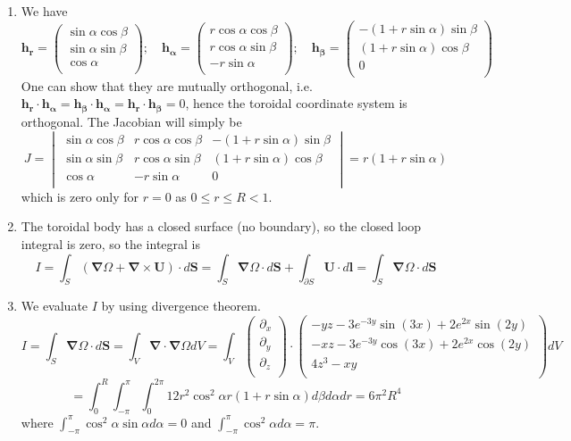 \documentclass[a4paper]{article}
\begin{document}
\begin{ans}\leavevmode
\begin{enumerate}[label=(\alph*)]
    \item We have
$$\mathbf{h_r}=\begin{pmatrix}\sin\alpha\cos\beta\\\sin\alpha\sin\beta\\\cos\alpha\\\end{pmatrix};\quad\boldsymbol{h_\alpha}=\begin{pmatrix}r\cos\alpha\cos\beta\\r\cos\alpha\sin\beta\\-r\sin\alpha\\\end{pmatrix};\quad\boldsymbol{h_\beta}=\begin{pmatrix}-(1+r\sin\alpha)\sin\beta\\(1+r\sin\alpha)\cos\beta\\0\\\end{pmatrix}$$
One can show that they are mutually orthogonal, i.e. $\boldsymbol{h_r}\cdot\boldsymbol{h_\alpha}=\boldsymbol{h_\beta}\cdot\boldsymbol{h_\alpha}=\boldsymbol{h_r}\cdot\boldsymbol{h_\beta}=0$, hence the toroidal coordinate system is orthogonal. The Jacobian will simply be
$$J=\begin{vmatrix}\sin\alpha\cos\beta&r\cos\alpha\cos\beta&-(1+r\sin\alpha)\sin\beta\\\sin\alpha\sin\beta&r\cos\alpha\sin\beta&(1+r\sin\alpha)\cos\beta\\\cos\alpha&-r\sin\alpha&0\\\end{vmatrix}=r(1+r\sin\alpha)$$
which is zero only for $r=0$ as $0\leq r\leq R<1$.
\item The toroidal body has a closed surface (no boundary), so the closed loop integral is zero, so the integral is 
$$I=\int_S(\boldsymbol{\nabla}\Omega+\boldsymbol{\nabla}\times\mathbf{U})\cdot d\mathbf{S}=\int_S\boldsymbol{\nabla}\Omega\cdot d\mathbf{S}+\int_{\partial S}\mathbf{U}\cdot d\mathbf{l}=\int_S\boldsymbol{\nabla}\Omega\cdot d\mathbf{S}$$
\item We evaluate $I$ by using divergence theorem.
$$I=\int_S\boldsymbol{\nabla}\Omega\cdot d\mathbf{S}=\int_V\boldsymbol{\nabla}\cdot\boldsymbol{\nabla}\Omega dV=\int_V\begin{pmatrix}\partial_x\\\partial_y\\\partial_z\\\end{pmatrix}\cdot\begin{pmatrix}-yz-3e^{-3y}\sin(3x)+2e^{2x}\sin(2y)\\-xz-3e^{-3y}\cos(3x)+2e^{2x}\cos(2y)\\4z^3-xy\\\end{pmatrix}dV$$
$$=\int_0^R\int_{-\pi}^\pi \int_0^{2\pi}12r^2\cos^2\alpha r(1+r\sin\alpha)d\beta d\alpha dr=6\pi^2R^4$$
where $\int_{-\pi}^\pi\cos^2\alpha\sin\alpha d\alpha=0$ and $\int_{-\pi}^\pi\cos^2\alpha d\alpha=\pi$.
\end{enumerate}
\end{ans}
\end{document}
